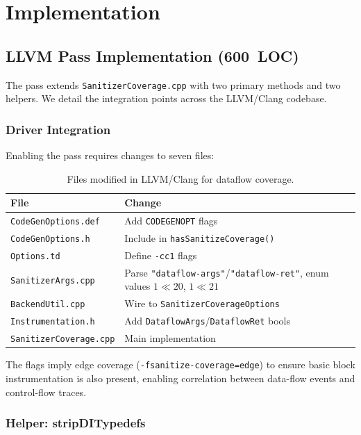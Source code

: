 \documentclass{ndss}
\begin{document}
\section{Implementation}\label{sec:impl}

\subsection{LLVM Pass Implementation (600~LOC)}

The pass extends \texttt{SanitizerCoverage.cpp} with two primary methods and
two helpers. We detail the integration points across the LLVM/Clang codebase.

\subsubsection{Driver Integration}

Enabling the pass requires changes to seven files:

\begin{table}[t]
\centering
\caption{Files modified in LLVM/Clang for dataflow coverage.}\label{tab:files}
\small
\begin{tabular}{@{}lp{5cm}@{}}
\toprule
\textbf{File} & \textbf{Change} \\
\midrule
\texttt{CodeGenOptions.def} & Add \texttt{CODEGENOPT} flags \\
\texttt{CodeGenOptions.h} & Include in \texttt{hasSanitizeCoverage()} \\
\texttt{Options.td} & Define \texttt{-cc1} flags \\
\texttt{SanitizerArgs.cpp} & Parse \texttt{"dataflow-args"}/\texttt{"dataflow-ret"}, enum values $1\ll20$, $1\ll21$ \\
\texttt{BackendUtil.cpp} & Wire to \texttt{SanitizerCoverageOptions} \\
\texttt{Instrumentation.h} & Add \texttt{DataflowArgs}/\texttt{DataflowRet} bools \\
\texttt{SanitizerCoverage.cpp} & Main implementation \\
\bottomrule
\end{tabular}
\end{table}

The flags imply edge coverage (\texttt{-fsanitize-coverage=edge}) to ensure
basic block instrumentation is also present, enabling correlation between
data-flow events and control-flow traces.

\subsubsection{Helper: stripDITypedefs}
\end{document}
